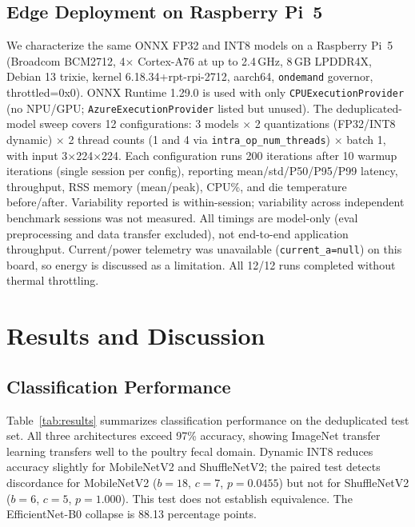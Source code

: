 \documentclass[conference,a4paper]{IEEEtran}
\begin{document}
\subsection{Edge Deployment on Raspberry Pi~5}
We characterize the same ONNX FP32 and INT8 models on a Raspberry Pi~5 (Broadcom BCM2712, 4$\times$ Cortex-A76 at up to 2.4\,GHz, 8\,GB LPDDR4X, Debian 13 trixie, kernel 6.18.34+rpt-rpi-2712, aarch64, \texttt{ondemand} governor, throttled=0x0). ONNX Runtime 1.29.0 is used with only \texttt{CPUExecutionProvider} (no NPU/GPU; \texttt{AzureExecutionProvider} listed but unused). The deduplicated-model sweep  covers 12 configurations: 3 models $\times$ 2 quantizations (FP32/INT8 dynamic) $\times$ 2 thread counts (1 and 4 via \texttt{intra\_op\_num\_threads}) $\times$ batch 1, with input 3$\times$224$\times$224. Each configuration runs 200 iterations after 10 warmup iterations (single session per config), reporting mean/std/P50/P95/P99 latency, throughput, RSS memory (mean/peak), CPU\%, and die temperature before/after. Variability reported is within-session; variability across independent benchmark sessions was not measured. All timings are model-only (eval preprocessing and data transfer excluded), not end-to-end application throughput. Current/power telemetry was unavailable (\texttt{current\_a=null}) on this board, so energy is discussed as a limitation. All 12/12 runs completed without thermal throttling.

\section{Results and Discussion}

\subsection{Classification Performance}

Table~\ref{tab:results} summarizes classification performance on the deduplicated test set. All three architectures exceed 97\% accuracy, showing ImageNet transfer learning transfers well to the poultry fecal domain. Dynamic INT8 reduces accuracy slightly for MobileNetV2 and ShuffleNetV2; the paired test detects discordance for MobileNetV2 ($b{=}18$, $c{=}7$, $p{=}0.0455$) but not for ShuffleNetV2 ($b{=}6$, $c{=}5$, $p{=}1.000$). This test does not establish equivalence. The EfficientNet-B0 collapse is 88.13 percentage points.
\end{document}
